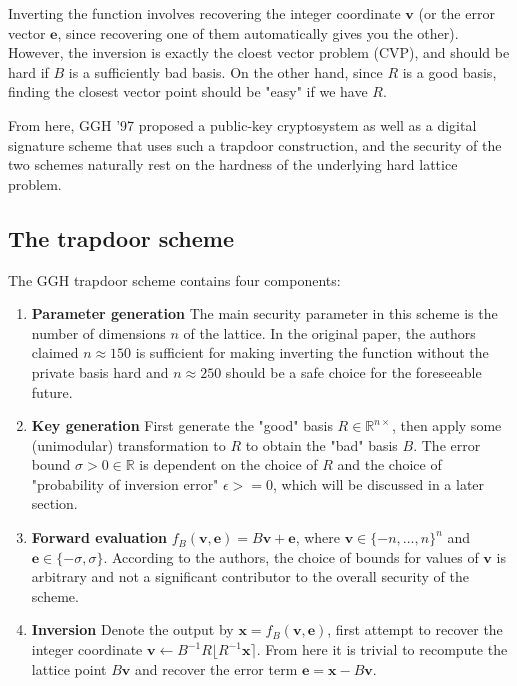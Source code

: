 \documentclass[letterpaper,12pt]{article}
\begin{document}
Inverting the function involves recovering the integer coordinate $\mathbf{v}$ (or the error vector $\mathbf{e}$, since recovering one of them automatically gives you the other). However, the inversion is exactly the cloest vector problem (CVP), and should be hard if $B$ is a sufficiently bad basis. On the other hand, since $R$ is a good basis, finding the closest vector point should be "easy" if we have $R$.

From here, GGH '97 proposed a public-key cryptosystem as well as a digital signature scheme that uses such a trapdoor construction, and the security of the two schemes naturally rest on the hardness of the underlying hard lattice problem.

\subsection{The trapdoor scheme}
The GGH trapdoor scheme contains four components:

\begin{enumerate}
    \item \textbf{Parameter generation} The main security parameter in this scheme is the number of dimensions $n$ of the lattice. In the original paper, the authors claimed $n \approx 150$ is sufficient for making inverting the function without the private basis hard and $n \approx 250$ should be a safe choice for the foreseeable future.
    \item \textbf{Key generation} First generate the "good" basis $R \in \mathbb{R}^{n \times }$, then apply some (unimodular) transformation to $R$ to obtain the "bad" basis $B$. The error bound $\sigma > 0 \in \mathbb{R}$ is dependent on the choice of $R$ and the choice of "probability of inversion error" $\epsilon >= 0$, which will be discussed in a later section.
    \item \textbf{Forward evaluation} $f_{B}(\mathbf{v}, \mathbf{e}) = B\mathbf{v} + \mathbf{e}$, where $\mathbf{v} \in \{-n, \ldots, n\}^n$ and $\mathbf{e} \in \{-\sigma, \sigma\}$. According to the authors, the choice of bounds for values of $\mathbf{v}$ is arbitrary and not a significant contributor to the overall security of the scheme.
    \item \textbf{Inversion} Denote the output by $\mathbf{x} = f_{B}(\mathbf{v}, \mathbf{e})$, first attempt to recover the integer coordinate $\mathbf{v} \leftarrow B^{-1}R\lfloor R^{-1}\mathbf{x} \rceil$. From here it is trivial to recompute the lattice point $B\mathbf{v}$ and recover the error term $\mathbf{e} = \mathbf{x} - B\mathbf{v}$.
\end{enumerate}
\end{document}
